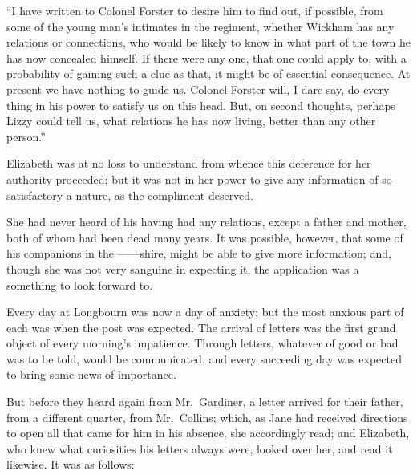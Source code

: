 “I have written to Colonel Forster to desire him to
find out, if possible, from some of the young man’s intimates
in the regiment, whether Wickham has any relations
or connections, who would be likely to know in what part
of the town he has now concealed himself. If there were
any one, that one could apply to, with a probability of
gaining such a clue as that, it might be of essential consequence.
At present we have nothing to guide us. Colonel
Forster will, I dare say, do every thing in his power to
satisfy us on this head. But, on second thoughts, perhaps
Lizzy could tell us, what relations he has now living,
better than any other person.”

Elizabeth was at no loss to understand from whence
this deference for her authority proceeded; but it was
not in her power to give any information of so satisfactory
a nature, as the compliment deserved.

She had never heard of his having had any relations,
except a father and mother, both of whom had been dead
many years. It was possible, however, that some of his
companions in the ------shire, might be able to give
more information; and, though she was not very sanguine
in expecting it, the application was a something to look
forward to.

Every day at Longbourn was now a day of anxiety;
but the most anxious part of each was when the post
was expected. The arrival of letters was the first grand
object of every morning’s impatience. Through letters,
whatever of good or bad was to be told, would be communicated,
and every succeeding day was expected to
bring some news of importance.

But before they heard again from Mr.\ Gardiner, a letter
arrived for their father, from a different quarter, from
Mr.\ Collins; which, as Jane had received directions to
open all that came for him in his absence, she accordingly
read; and Elizabeth, who knew what curiosities his letters
always were, looked over her, and read it likewise. It was
as follows:


